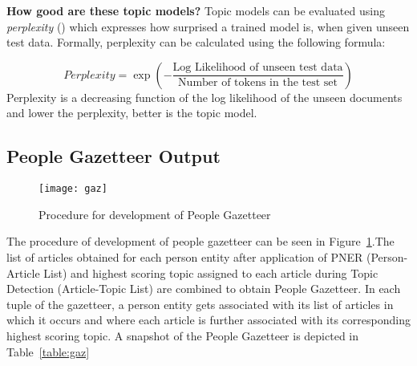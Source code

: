 \noindent \textbf{How good are these topic models?}
Topic models can be evaluated using \emph{perplexity} (\cite{newman2009distributed, blei2003latent}) which expresses how surprised a trained model is, when given unseen test data. %
Formally, perplexity can be calculated using the following formula:

$$Perplexity= \exp(-\dfrac{\text{Log Likelihood of unseen test data}}{\text{Number of tokens in the test set}})$$
Perplexity is a decreasing function of the log likelihood of the unseen documents and lower the perplexity, better is the topic model.


\subsection{People Gazetteer Output }
\label{gaz:result}


\begin{figure}[h]
\centerline{\texttt{[image: gaz]}}
\caption{Procedure for development of People Gazetteer}
\label{figure:gaze}
\end{figure}


The procedure of development of people gazetteer can be seen in Figure~\ref{figure:gaze}.The list of articles obtained for each person entity after application of PNER (Person-Article List) and highest scoring topic assigned to each article during Topic Detection (Article-Topic List) are combined to obtain People Gazetteer. In each tuple of the gazetteer, a person entity gets associated with its list of articles in which it occurs and where each article is further associated with its corresponding highest scoring topic. A snapshot of the People Gazetteer is depicted in Table~\ref{table:gaz}

